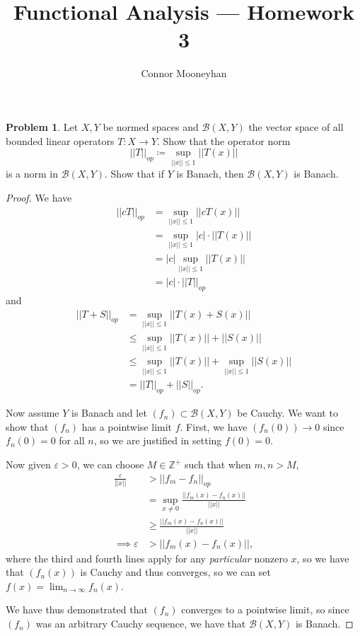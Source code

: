\documentclass[12pt]{article}
\title{Functional Analysis --- Homework 3}
\author{Connor Mooneyhan}
\date{}
\theoremstyle{definition}
\newtheorem{ex}{Problem}
\begin{document}
\maketitle

\begin{ex}
	Let $X, Y$ be normed spaces and $\mathcal{B}(X, Y)$ the vector space of all bounded linear operators $T : X \to Y$.
	Show that the operator norm \begin{equation*}
		||T||_{op} \coloneq \sup_{||x|| \leq 1} ||T(x)||
	\end{equation*}
	is a norm in $\mathcal{B}(X, Y)$.
	Show that if $Y$ is Banach, then $\mathcal{B}(X, Y)$ is Banach.
\end{ex}
\begin{proof}
	We have \begin{align*}
		||cT||_{op} & = \sup_{||x|| \leq 1} ||cT(x)||        \\
		            & = \sup_{||x|| \leq 1} |c|\cdot||T(x)|| \\
		            & = |c| \sup_{||x|| \leq 1} ||T(x)||     \\
		            & = |c| \cdot ||T||_{op}
	\end{align*}
	and \begin{align*}
		||T + S||_{op} & = \sup_{||x|| \leq 1} ||T(x) + S(x)||                            \\
		               & \leq \sup_{||x|| \leq 1} ||T(x)|| + ||S(x)||                     \\
		               & \leq \sup_{||x|| \leq 1} ||T(x)|| + \sup_{||x|| \leq 1} ||S(x)|| \\
		               & = ||T||_{op} + ||S||_{op}.
	\end{align*}

	Now assume $Y$ is Banach and let $(f_n) \subset \mathcal{B}(X, Y)$ be Cauchy.
	We want to show that $(f_n)$ has a pointwise limit $f$.
	First, we have $(f_n(0)) \to 0$ since $f_n(0) = 0$ for all $n$, so we are justified in setting $f(0) = 0$.

	Now given $\varepsilon > 0$, we can choose $M \in \mathbb{Z}^+$ such that when $m, n > M$, \begin{align*}
		\frac{\varepsilon}{||x||} & > ||f_m - f_n||_{op}                              \\
		                          & = \sup_{x \neq 0} \frac{||f_m(x)-f_n(x)||}{||x||} \\
		                          & \geq \frac{||f_m(x)-f_n(x)||}{||x||}              \\
		\implies \varepsilon      & > ||f_m(x) - f_n(x)||,
	\end{align*}
	where the third and fourth lines apply for any \textit{particular} nonzero $x$, so we have that $(f_n(x))$ is Cauchy and thus converges, so we can set $f(x) = \lim_{n \to \infty} f_n(x)$.

	We have thus demonstrated that $(f_n)$ converges to a pointwise limit, so since $(f_n)$ was an arbitrary Cauchy sequence, we have that $\mathcal{B}(X, Y)$ is Banach.
\end{proof}
\end{document}
